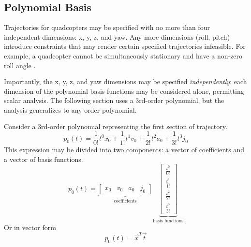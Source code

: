 \documentclass[12pt]{article}
\begin{document}
\subsection{Polynomial Basis}
Trajectories for quadcopters may be specified with no more than four independent
dimensions: x, y, z, and yaw. Any more dimensions (roll, pitch) introduce
constraints that may render certain specified trajectories infeasible. For
example, a quadcopter cannot be simultaneously stationary and have a non-zero
roll angle \cite{mellinger2011minimum}.

Importantly, the x, y, z, and yaw dimensions may be specified
\textit{independently}: each dimension of the polynomial basis functions may be
considered alone, permitting scalar analysis. The following section uses a
3rd-order polynomial, but the analysis generalizes to any order polynomial.

Consider a 3rd-order polynomial representing the first section of trajectory.
\begin{equation*}
  p_{0}(t) = \frac{1}{0!}t^{0}x_{0} + \frac{1}{1!}t^{1}v_{0}
           + \frac{1}{2!}t^{2}a_{0} + \frac{1}{3!}t^{3}j_{0}
\end{equation*}
%
This expression may be divided into two components: a vector of coefficients and
a vector of basis functions.
\begin{equation*}
  p_{0}(t) = 
  \underbrace{
  \begin{bmatrix}
    x_{0} & v_{0} & a_{0} & j_{0}
  \end{bmatrix}
  }_{\text{coefficients}}
  \underbrace{
  \begin{bmatrix}
    \frac{t^{0}}{0!} \\[6pt]
    \frac{t^{1}}{1!} \\[6pt]
    \frac{t^{2}}{2!} \\[6pt]
    \frac{t^{3}}{3!}
  \end{bmatrix}
  }_{\text{basis functions}}
\end{equation*}
%
Or in vector form
\begin{equation*}
  p_{0}(t) = \vec{x}^{T} \vec{t}
\end{equation*}
\end{document}

